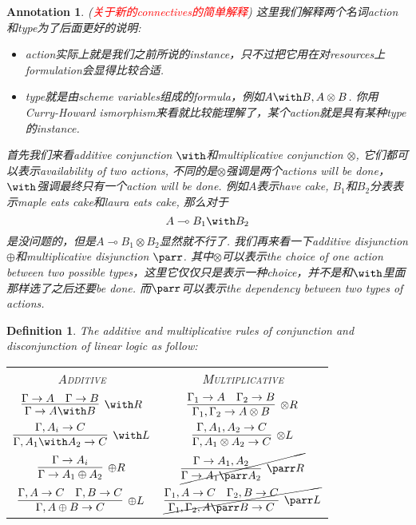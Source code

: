 \documentclass{article}
\theoremstyle{plain}
\newtheorem{definition}[theorem]{Definition}
\newtheorem{annotation}[theorem]{Annotation}
\theoremstyle{nonumberplain}
\newcommand{\redt}[1]{\textcolor{red}{#1}}
\begin{document}
\begin{annotation}
\rm (\redt{关于新的connectives的简单解释}) 这里我们解释两个名词action和type为了后面更好的说明: 
\begin{itemize}
	\item action实际上就是我们之前所说的instance，只不过把它用在对resources上formulation会显得比较合适. 
	\item type就是由scheme variables组成的formula，例如$A \with B, A \otimes B$. 你用Curry-Howard ismorphism来看就比较能理解了，某个action就是具有某种type的instance. 
\end{itemize}
首先我们来看additive conjunction $\with$和multiplicative conjunction $\otimes$, 它们都可以表示availability of two actions, 不同的是$\otimes$强调是两个actions will be done，$\with$强调最终只有一个action will be done. 例如$A$表示have cake, $B_1$和$B_2$分表表示maple eats cake和laura eats cake, 那么对于
\[
A \multimap B_1 \with B_2
\]
是没问题的，但是$A \multimap B_1 \otimes B_2$显然就不行了. 我们再来看一下additive disjunction $\oplus$和multiplicative disjunction $\parr$. 其中$\otimes$可以表示the choice of one action between two possible types，这里它仅仅只是表示一种choice，并不是和$\with$里面那样选了之后还要be done. 而$\parr$可以表示the dependency between two types of actions. 
\end{annotation}

\begin{definition}
\rm The additive and multiplicative rules of conjunction and disconjunction of linear logic as follow:
\begin{center}
\setlength\tabcolsep{12pt}
\begin{tabular}{c|c}
\textsc{Additive} & \textsc{Multiplicative} \\[0.5em]
$\infer[\with R]{\Gamma \to A \with B}{\Gamma \to A & \Gamma \to B}$ & $\infer[\otimes R]{\Gamma_1,\Gamma_2 \to A \otimes B}{\Gamma_1 \to A & \Gamma_2 \to B}$  \\[0.5em]
$\infer[\with L]{\Gamma, A_1 \with A_2 \to C}{\Gamma, A_i \to C}$ & $\infer[\otimes L]{\Gamma, A_1 \otimes A_2 \to C}{\Gamma, A_1, A_2 \to C}$ \\[0.5em]
$\infer[\oplus R]{\Gamma \to A_1 \oplus A_2}{\Gamma \to A_i}$ & $\cancel{\infer[\parr R]{\Gamma \to A_1 \parr A_2}{\Gamma \to A_1, A_2}}$ \\[0.5em]
$\infer[\oplus L]{\Gamma, A \oplus B \to C}{\Gamma ,A \to C & \Gamma ,B \to C}$ & $\cancel{\infer[\parr L]{\Gamma_1,\Gamma_2, A \parr B \to C}{\Gamma_1 ,A \to C & \Gamma_2 ,B \to C}}$
\end{tabular}
\end{center}
\end{definition}
\end{document}

